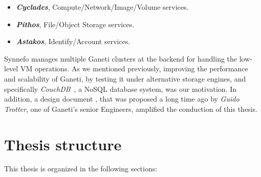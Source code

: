 \begin{itemize}
  \item \textbf{\emph{Cyclades}}, Compute/Network/Image/Volume services.
  \item \textbf{\emph{Pithos}}, File/Object Storage services.
  \item \textbf{\emph{Astakos}}, Identify/Account services.
\end{itemize}

Synnefo manages multiple Ganeti clusters at the backend for handling the
low-level VM operations. As we mentioned previously, improving the performance
and scalability of Ganeti, by testing it under alternative storage engines, and
specifically \emph{CouchDB}~, a NoSQL database
system, was our motivation. In addition, a design document
, that
was proposed a long time ago by \emph{Guido Trotter}, one of Ganeti's senior
Engineers, amplified the conduction of this thesis.

\section{Thesis structure}

This thesis is organized in the following sections:

